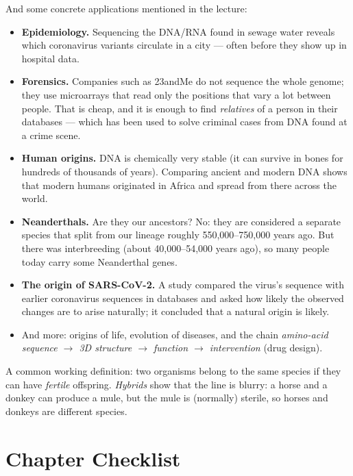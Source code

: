 \documentclass[11pt, oneside]{book}
\let\originalsection\section
\renewcommand{\section}{\Needspace{7\baselineskip}\originalsection}
\begin{document}
And some concrete applications mentioned in the lecture:
\begin{itemize}
  \item \textbf{Epidemiology.} Sequencing the DNA/RNA found in sewage water
    reveals which coronavirus variants circulate in a city --- often before
    they show up in hospital data.
  \item \textbf{Forensics.} Companies such as 23andMe do not sequence the whole
    genome; they use microarrays that read only the positions that vary a
    lot between people. That is cheap, and it is enough to find
    \emph{relatives} of a person in their databases --- which has been used
    to solve criminal cases from DNA found at a crime scene.
  \item \textbf{Human origins.} DNA is chemically very stable (it can survive
    in bones for hundreds of thousands of years). Comparing ancient and
    modern DNA shows that modern humans originated in Africa and spread from
    there across the world.
  \item \textbf{Neanderthals.} Are they our ancestors? No: they are
    considered a separate species that split from our lineage roughly
    550,000--750,000 years ago. But there was interbreeding (about
    40,000--54,000 years ago), so many people today carry some Neanderthal
    genes.
  \item \textbf{The origin of SARS-CoV-2.} A study compared the virus's
    sequence with earlier coronavirus sequences in databases and asked how
    likely the observed changes are to arise naturally; it concluded that a
    natural origin is likely.
  \item And more: origins of life, evolution of diseases, and the chain
    \emph{amino-acid sequence $\to$ 3D structure $\to$ function $\to$
    intervention} (drug design).
\end{itemize}

\begin{notebox}[title={What is a species?}]
A common working definition: two organisms belong to the same species if
they can have \emph{fertile} offspring. \emph{Hybrids} show that the line is
blurry: a horse and a donkey can produce a mule, but the mule is (normally)
sterile, so horses and donkeys are different species.
\end{notebox}

\section{Chapter Checklist}
\end{document}
